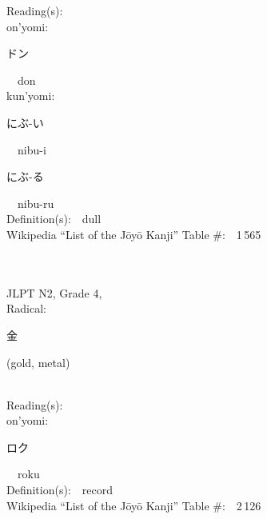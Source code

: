 \begin{multicols}{2}
Reading(s):\ \ \\
{\hspace*{1em}}on'yomi:\ \ \\
{\hspace*{2em}}{\begin{CJK}{UTF8}{min} ドン \end{CJK}}\ \ don\ \ \\
{\hspace*{1em}}kun'yomi:\ \ \\
{\hspace*{2em}}{\begin{CJK}{UTF8}{min} にぶ-い \end{CJK}}\ \ nibu-i\ \ \\
{\hspace*{2em}}{\begin{CJK}{UTF8}{min} にぶ-る \end{CJK}}\ \ nibu-ru\ \ \\
Definition(s):\ \ dull \\
Wikipedia ``List of the J\=oy\=o Kanji'' Table \#:\ \ 1\,565 \\
\ \ \\
{\fontsize{34pt}{40pt}  }\ \ \\  %
{JLPT N2, Grade 4, \\Radical:\ \ {\begin{CJK}{UTF8}{min} 金 \end{CJK}} (gold, metal) } \\
Reading(s):\ \ \\
{\hspace*{1em}}on'yomi:\ \ \\
{\hspace*{2em}}{\begin{CJK}{UTF8}{min} ロク \end{CJK}}\ \ roku\ \ \\
Definition(s):\ \ record \\
Wikipedia ``List of the J\=oy\=o Kanji'' Table \#:\ \ 2\,126 \\
\ \ \\
\end{multicols}



